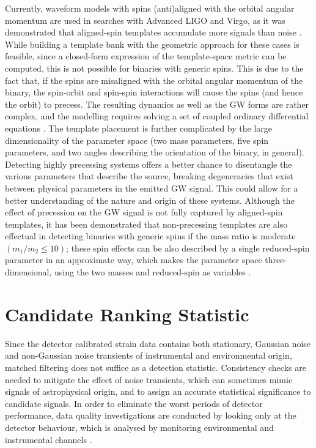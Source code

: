 \documentclass[binding=0.6cm, LaM]{sapthesis}
\begin{document}
	Currently, waveform models with spins (anti)aligned with the orbital angular momentum 
	are used in searches with Advanced LIGO and Virgo, 
	as it was demonstrated that aligned-spin templates accumulate more signals than noise \cite{27}. 
	While building a template bank with the geometric approach for these cases is feasible, 
	since a closed-form expression of the template-space metric can be computed, 
	this is not possible for binaries with generic spins. 
	This is due to the fact that, 
	if the spins are misaligned with the orbital angular momentum of the binary, 
	the spin-orbit and spin-spin interactions will cause the spins 
	(and hence the orbit) to precess. 
	The resulting dynamics as well as the GW forms are rather complex, 
	and the modelling requires solving a set of coupled ordinary differential equations \cite{39}. 
	The template placement is further complicated by the large dimensionality of the parameter space 
	(two mass parameters, five spin parameters, and two angles describing the orientation of the binary, in general). 
	Detecting highly precessing systems offers a better chance to 
	disentangle the various parameters that describe the source,  
	breaking degeneracies that exist between physical parameters 
	in the emitted GW signal.  
	This could allow for a better understanding of the nature and origin of these systems.
	Although the effect of precession on the GW signal is not fully captured 
	by aligned-spin templates, it has been demonstrated that non-precessing templates 
	are also effectual in detecting binaries with generic spins if the mass ratio is moderate 
	$(m_1/m_2 \leq 10)$; these spin effects can be also described by 
	a single reduced-spin parameter in an approximate way, 
	which makes the parameter space three-dimensional, 
	using the two masses and reduced-spin as variables \cite{32}. 
	
\section{Candidate Ranking Statistic}
\label{sec:ranking}
 	Since the detector calibrated strain data contains both stationary, Gaussian noise
        and non-Gaussian noise transients of instrumental and environmental origin,
        matched filtering does not suffice as a detection statistic.
        Consistency checks are needed to mitigate the effect of noise transients,
        which can sometimes mimic signals of astrophysical origin,
        and to assign an accurate statistical significance to candidate signals.
        In order to eliminate the worst periods of detector performance, 
        data quality investigations are conducted by looking only at the detector behaviour,  
        which is analysed by monitoring environmental and instrumental channels \cite{40}.
\end{document}
